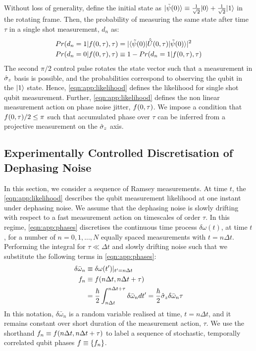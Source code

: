 Without loss of generality, define the initial state as  $| \tilde{\psi} (0) \rangle \equiv \frac{1}{\sqrt{2}} | 0 \rangle + \frac{1}{\sqrt{2}} | 1 \rangle$ in the rotating frame. Then, the probability of measuring the same state after time $\tau$ in a single shot measurement, $d_n$ as:
\begin{align} 
Pr(d_n = 1| f(0, \tau), \tau) & = |\langle \tilde{\psi} (0) | \hat{\tilde{U}}(0, \tau) | \tilde{\psi} (0) \rangle|^2 \label{eqn:app:likelihood} \\
Pr(d_n = 0| f(0, \tau), \tau) & \equiv 1 -Pr(d_n = 1| f(0, \tau), \tau)
\end{align}
The second $\pi/2$ control pulse rotates the state vector such that a measurement in $\hat{\sigma}_{z}$ basis is possible, and the probabilities correspond to observing the qubit in the   $| 1 \rangle$ state. Hence, \cref{eqn:app:likelihood} defines the likelihood for single shot qubit measurement. Further, \cref{eqn:app:likelihood} defines the non linear measurement action on phase noise jitter, $f(0, \tau)$.  We impose a condition that $f(0, \tau)/2 \leq \pi$  such that accumulated phase over $\tau$ can be inferred from a projective measurement on the $\hat{\sigma}_{z}$ axis. 


\subsection{Experimentally Controlled Discretisation of Dephasing Noise \label{sec:app:exptres}} 
 In this section, we consider a sequence of Ramsey measurements. At time $t$, the \cref{eqn:app:likelihood} describes the qubit measurement likelihood at one instant under dephasing noise. We assume that the dephasing noise is slowly drifting with respect to a fast measurement action on timescales of order $\tau$. In this regime, \cref{eqn:app:phases} discretises the continuous time process $\delta\omega(t)$, at time $t$, for a number of $n= 0, 1, ..., N$ equally spaced measurements with $t = n \Delta t$. Performing the integral for $\tau \ll \Delta t$ and slowly drifting noise such that we substitute the following terms in \cref{eqn:app:phases}:
\begin{align}
\delta\bar{\omega}_n &\equiv \delta\omega(t')|_{t'=n \Delta t } \\
f_n &\equiv f(n\Delta t, n\Delta t + \tau) \\
&=\frac{\hbar}{2}  \int_{n\Delta t}^{n\Delta t + \tau} \delta\bar{\omega}_n dt'  = \frac{\hbar}{2}\hat{\sigma}_{z}\delta\bar{\omega}_n \tau \label{eqn:app:phases_constantdetuning}
\end{align}
In this notation, $\delta\bar{\omega}_n $ is a random variable realised at time, $t = n \Delta t$, and it remains constant over short duration of the measurement action, $\tau$.  We use the shorthand $f_n \equiv f(n\Delta t, n\Delta t + \tau)$ to label a sequence of stochastic, temporally correlated qubit phases $ f \equiv \{f_n \}$. 

